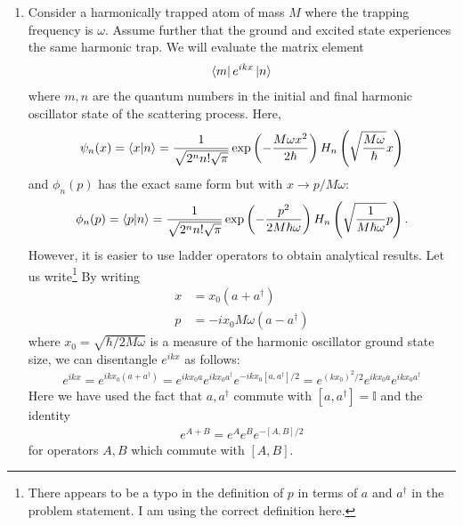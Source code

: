 \documentclass{article}
\theoremstyle{definition}
\newcommand{\f}[2]{\frac{#1}{#2}}
\newcommand{\lp}{\left(}
\newcommand{\rp}{\right)}
\begin{document}
\begin{enumerate}[label = (\alph*)]
	
	\item Consider a harmonically trapped atom of mass $M$ where the trapping frequency is $\omega$. Assume further that the ground and excited state experiences the same harmonic trap. We will evaluate the matrix element 
	\begin{align*}
	\bra{m} e^{ikx} \ket{n}
	\end{align*}
	where $m,n$ are the quantum numbers in the initial and final harmonic oscillator state of the scattering process. Here, 
	\begin{align*}
	\psi_n(x) = \bra{x}\ket{n} = \f{1}{\sqrt{2^n n! \sqrt{\pi}}} \exp\lp -\f{M\omega x^2}{2\hbar} \rp H_n\lp \sqrt{\f{M\omega}{\hbar}} x \rp
	\end{align*}
	and $\phi_n(p)$ has the exact same form but with $x\to p/M\omega$:
	\begin{align*}
	\phi_n(p) = \bra{p}\ket{n} = \f{1}{\sqrt{2^n n! \sqrt{\pi}}} 
	\exp\lp -\f{p^2}{2M\hbar\omega} \rp H_n\lp \sqrt{\f{1}{M \hbar \omega}} p \rp.
	\end{align*}
	However, it is easier to use ladder operators to obtain analytical results. Let us  write\footnote{There appears to be a typo in the definition of $p$ in terms of $a$ and $a^\dagger$ in the problem statement. I am using the correct definition here.} By writing 
	\begin{align*}
	x &= x_0 (a+ a^\dagger) \\
	p &= -ix_0 M\omega (a - a^\dagger) 
	\end{align*}
	where $x_0 = \sqrt{\hbar/2M\omega}$ is a measure of the harmonic oscillator ground state size, we can disentangle $e^{ikx}$ as follows:
	\begin{align*}
	{e^{ikx}} = e^{ikx_0(a+a^\dagger)} = e^{ikx_0 a} e^{ikx_0 a^\dagger} e^{-ikx_0[a,a^\dagger]/2}
	= {e^{(kx_0)^2/2} e^{ikx_0 a} e^{ikx_0 a^\dagger}}
	\end{align*}
	Here we have used the fact that $a,a^\dagger$ commute with $[a,a^\dagger] =  \mathbb{I}$ and the identity
	\begin{align*}
	e^{A+B} = e^{A} e^B e^{-[A,B]/2} 
	\end{align*}
	for operators $A,B$ which commute with $[A,B]$. 
	

\end{enumerate}
\end{document}
